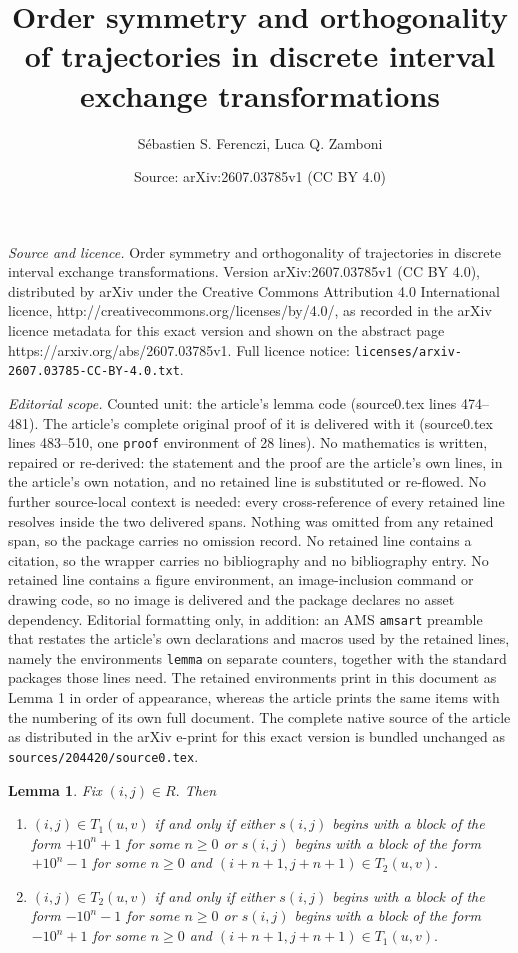 \documentclass[10pt,a4paper]{amsart}
\title{Order symmetry and orthogonality of trajectories in discrete interval exchange transformations}
\author{S\'ebastien S. Ferenczi, Luca Q. Zamboni}
\date{Source: arXiv:2607.03785v1 (CC BY 4.0)}
\newtheorem{lemma}{Lemma}
\begin{document}
\maketitle

\noindent\emph{Source and licence.} Order symmetry and orthogonality of trajectories in discrete interval exchange transformations. Version arXiv:2607.03785v1 (CC BY 4.0), distributed by arXiv under the Creative Commons Attribution 4.0 International licence, http://creativecommons.org/licenses/by/4.0/, as recorded in the arXiv licence metadata for this exact version and shown on the abstract page https://arxiv.org/abs/2607.03785v1. Full licence notice: \texttt{licenses/arxiv-2607.03785-CC-BY-4.0.txt}.\par\smallskip

\noindent\textit{Editorial scope.} Counted unit: the article's lemma code (source0.tex lines 474--481). The article's complete original proof of it is delivered with it (source0.tex lines 483--510, one \texttt{proof} environment of 28 lines). No mathematics is written, repaired or re-derived: the statement and the proof are the article's own lines, in the article's own notation, and no retained line is substituted or re-flowed.  No further source-local context is needed: every cross-reference of every retained line resolves inside the two delivered spans.  Nothing was omitted from any retained span, so the package carries no omission record.  No retained line contains a citation, so the wrapper carries no bibliography and no bibliography entry.  No retained line contains a figure environment, an image-inclusion command or drawing code, so no image is delivered and the package declares no asset dependency.  Editorial formatting only, in addition: an AMS \texttt{amsart} preamble that restates the article's own declarations and macros used by the retained lines, namely the environments \texttt{lemma} on separate counters, together with the standard packages those lines need.  The retained environments print in this document as Lemma 1 in order of appearance, whereas the article prints the same items with the numbering of its own full document.  The complete native source of the article as distributed in the arXiv e-print for this exact version is bundled unchanged as \texttt{sources/204420/source0.tex}.
\begin{lemma}\label{code}Fix $(i,j)\in R.$  Then
\begin{enumerate}
\item $(i,j)\in T_1(u,v)$ if and only if either $s(i,j)$ begins with a block of the form $+10^n+1$ for some $n\geq 0$ or $s(i,j)$ begins with a block of the form
 $+10^n-1$ for some $n\geq 0$ and $(i+n+1,j+n+1)\in T_2(u,v).$
\item $(i,j)\in T_2(u,v)$ if and only if either $s(i,j)$ begins with a block of the form $-10^n-1$ for some $n\geq 0$ or $s(i,j)$ begins with a block of the form
 $-10^n+1$ for some $n\geq 0$ and $(i+n+1,j+n+1)\in T_1(u,v).$
\end{enumerate}
\end{lemma}
\end{document}
